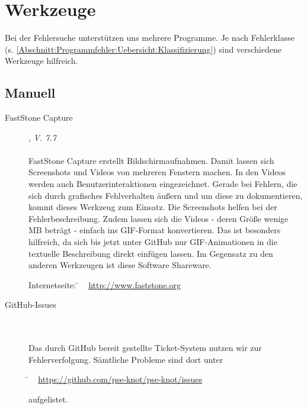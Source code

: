 %



\newpage



\section{Werkzeuge}
\label{Abschnitt:Programmfehler:Werkzeuge}

Bei der Fehlersuche unterstützen uns mehrere Programme.
Je nach Fehlerklasse (s. \ref{Abschnitt:Programmfehler:Uebersicht:Klassifizierung}) sind verschiedene Werkzeuge hilfreich.




\subsection{Manuell}
\label{Abschnitt:Programmfehler:Werkzeuge:Manuell}


\begin{description}

	\item[FastStone Capture], \textit{V. 7.7}\hfill
		\\
		\\
		FastStone Capture erstellt Bildschirmaufnahmen. Damit lassen sich Screenshots und Videos von mehreren Fenstern machen. In den Videos werden auch Benutzerinteraktionen eingezeichnet. Gerade bei Fehlern, die sich durch grafisches Fehlverhalten äußern und um diese zu dokumentieren, kommt dieses Werkzeug zum Einsatz. Die Screenshots helfen bei der Fehlerbeschreibung. Zudem lassen sich die Videos - deren Größe wenige MB beträgt - einfach ins GIF-Format konvertieren. Das ist besonders hilfreich, da sich bis jetzt unter GitHub nur GIF-Animationen in die textuelle Beschreibung direkt einfügen lassen. Im Gegensatz zu den anderen Werkzeugen ist diese Software Shareware.
		
		\begin{tabbing}
			Internetseite:
			\= ~ \href {http://www.faststone.org}
		    	       {http://www.faststone.org}
		    \\
		\end{tabbing}
		
		\item[GitHub-Issues] \hfill
		\\
		\\
		Das durch GitHub bereit gestellte Ticket-System nutzen wir zur Fehlerverfolgung. Sämtliche Probleme sind dort unter
		
		\begin{tabbing}
				\= ~ \href {https://github.com/pse-knot/pse-knot/issues}
    	       			   {https://github.com/pse-knot/pse-knot/issues}
    	       			   
		\end{tabbing} aufgelistet.
		

\end{description}




